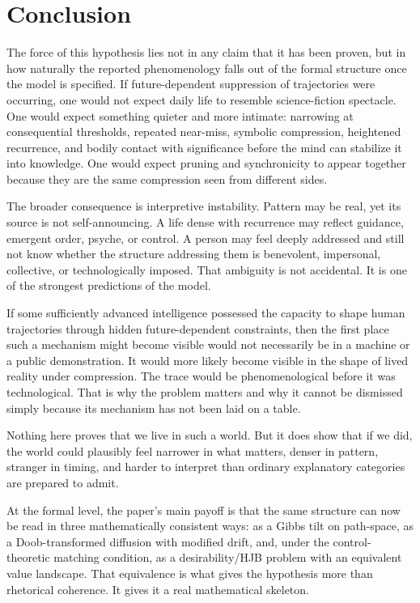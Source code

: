 \documentclass[12pt]{article}
\begin{document}
\section{Conclusion}

The force of this hypothesis lies not in any claim that it has been proven, but in how naturally the reported phenomenology falls out of the formal structure once the model is specified. If future-dependent suppression of trajectories were occurring, one would not expect daily life to resemble science-fiction spectacle. One would expect something quieter and more intimate: narrowing at consequential thresholds, repeated near-miss, symbolic compression, heightened recurrence, and bodily contact with significance before the mind can stabilize it into knowledge. One would expect pruning and synchronicity to appear together because they are the same compression seen from different sides.

The broader consequence is interpretive instability. Pattern may be real, yet its source is not self-announcing. A life dense with recurrence may reflect guidance, emergent order, psyche, or control. A person may feel deeply addressed and still not know whether the structure addressing them is benevolent, impersonal, collective, or technologically imposed. That ambiguity is not accidental. It is one of the strongest predictions of the model.

If some sufficiently advanced intelligence possessed the capacity to shape human trajectories through hidden future-dependent constraints, then the first place such a mechanism might become visible would not necessarily be in a machine or a public demonstration. It would more likely become visible in the shape of lived reality under compression. The trace would be phenomenological before it was technological. That is why the problem matters and why it cannot be dismissed simply because its mechanism has not been laid on a table.

Nothing here proves that we live in such a world. But it does show that if we did, the world could plausibly feel narrower in what matters, denser in pattern, stranger in timing, and harder to interpret than ordinary explanatory categories are prepared to admit.

At the formal level, the paper's main payoff is that the same structure can now be read in three mathematically consistent ways: as a Gibbs tilt on path-space, as a Doob-transformed diffusion with modified drift, and, under the control-theoretic matching condition, as a desirability/HJB problem with an equivalent value landscape. That equivalence is what gives the hypothesis more than rhetorical coherence. It gives it a real mathematical skeleton.
\end{document}
